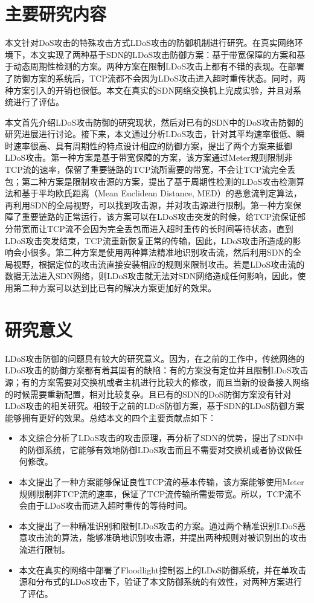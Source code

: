 \section{主要研究内容}
\label{sec:work}
本文针对DoS攻击的特殊攻击方式LDoS攻击的防御机制进行研究。在真实网络环境下，本文实现了两种基于SDN的LDoS攻击防御方案：基于带宽保障的方案和基于动态周期性检测的方案。两种方案在限制LDoS攻击上都有不错的表现。在部署了防御方案的系统后，TCP流都不会因为LDoS攻击进入超时重传状态。同时，两种方案引入的开销也很低。本文在真实的SDN网络交换机上完成实验，并且对系统进行了评估。

本文首先介绍LDoS攻击防御的研究现状，然后对已有的SDN中的DoS攻击防御的研究进展进行讨论。接下来，本文通过分析LDoS攻击，针对其平均速率很低、瞬时速率很高、具有周期性的特点设计相应的防御方案，提出了两个方案来抵御LDoS攻击。第一种方案是基于带宽保障的方案，该方案通过Meter规则限制非TCP流的速率，保留了重要链路的TCP流所需要的带宽，不会让TCP流完全丢包；第二种方案是限制攻击源的方案，提出了基于周期性检测的LDoS攻击检测算法和基于平均欧氏距离（Mean Euclidean Distance, MED）的恶意流判定算法，再利用SDN的全局视野，可以找到攻击源，并对攻击源进行限制。第一种方案保障了重要链路的正常运行，该方案可以在LDoS攻击突发的时候，给TCP流保证部分带宽而让TCP流不会因为完全丢包而进入超时重传的长时间等待状态，直到LDoS攻击突发结束，TCP流重新恢复正常的传输，因此，LDoS攻击所造成的影响会小很多。第二种方案是使用两种算法精准地识别攻击流，然后利用SDN的全局视野，根据定位的攻击流直接安装相应的规则来限制攻击。若是LDoS攻击流的数据无法进入SDN网络，则LDoS攻击就无法对SDN网络造成任何影响，因此，使用第二种方案可以达到比已有的解决方案更加好的效果。


\section{研究意义}
\label{sec:contribution}
LDoS攻击防御的问题具有较大的研究意义。因为，在之前的工作中，传统网络的LDoS攻击的防御方案都有着其固有的缺陷：有的方案\cite{b4}没有定位并且限制LDoS攻击源；有的方案\cite{b17}需要对交换机或者主机进行比较大的修改，而且当新的设备接入网络的时候需要重新配置，相对比较复杂。且已有的SDN的DoS防御方案没有针对LDoS攻击的相关研究。相较于之前的LDoS防御方案，基于SDN的LDoS防御方案能够拥有更好的效果。总结本文的四个主要贡献点如下：

\begin{itemize}
    \item 本文综合分析了LDoS攻击的攻击原理，再分析了SDN的优势，提出了SDN中的防御系统，它能够有效地防御LDoS攻击而且不需要对交换机或者协议做任何修改。
    \item 本文提出了一种方案能够保证良性TCP流的基本传输，该方案能够使用Meter规则限制非TCP流的速率，保证了TCP流传输所需要带宽。所以，TCP流不会由于LDoS攻击而进入超时重传的等待时间。
    \item 本文提出了一种精准识别和限制LDoS攻击的方案。通过两个精准识别LDoS恶意攻击流的算法，能够准确地识别攻击源，并提出两种规则对被识别出的攻击流进行限制。
    \item 本文在真实的网络中部署了Floodlight控制器上的LDoS防御系统，并在单攻击源和分布式的LDoS攻击下，验证了本文防御系统的有效性，对两种方案进行了评估。
\end{itemize}

